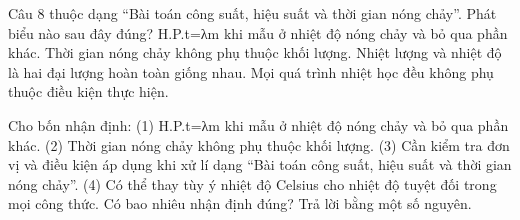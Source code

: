 \begin{ex}
Câu 8 thuộc dạng “Bài toán công suất, hiệu suất và thời gian nóng chảy”. Phát biểu nào sau đây đúng?
\choice
{\True H.P.t=λm khi mẫu ở nhiệt độ nóng chảy và bỏ qua phần khác.}
{Thời gian nóng chảy không phụ thuộc khối lượng.}
{Nhiệt lượng và nhiệt độ là hai đại lượng hoàn toàn giống nhau.}
{Mọi quá trình nhiệt học đều không phụ thuộc điều kiện thực hiện.}
\end{ex}

\begin{ex}
Cho bốn nhận định: (1) H.P.t=λm khi mẫu ở nhiệt độ nóng chảy và bỏ qua phần khác. (2) Thời gian nóng chảy không phụ thuộc khối lượng. (3) Cần kiểm tra đơn vị và điều kiện áp dụng khi xử lí dạng “Bài toán công suất, hiệu suất và thời gian nóng chảy”. (4) Có thể thay tùy ý nhiệt độ Celsius cho nhiệt độ tuyệt đối trong mọi công thức. Có bao nhiêu nhận định đúng? Trả lời bằng một số nguyên.
\end{ex}
